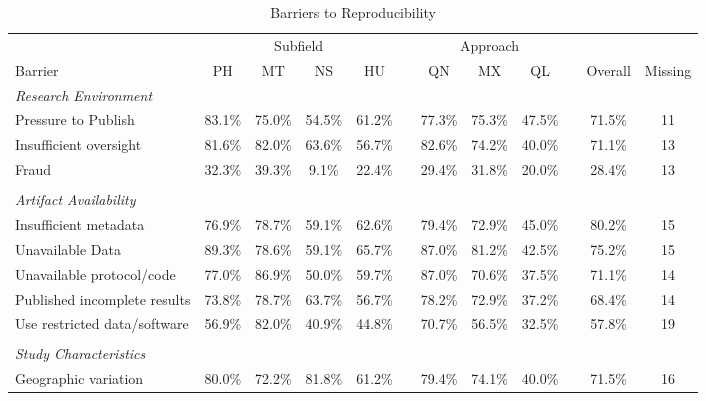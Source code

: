 \documentclass[]{interact}
\theoremstyle{plain}%
\theoremstyle{definition}
\theoremstyle{remark}
\begin{document}
\newpage
\begin{landscape}
\begin{table}[h]
    \centering
    \begin{threeparttable}
    \caption{Barriers to Reproducibility}
    \begin{tabular}{l c c c c c c c c c c c}
         \hline
                    & \multicolumn{4}{1}{Subfield}  & & \multicolumn{3}{1}{Approach} & & &\\
         Barrier    & PH & MT & NS & HU            & & QN & MX & QL              & & Overall & Missing\\
         \hline
         \textit{Research Environment}      & & & & & & & & & & &\\
         Pressure to Publish                & 83.1\% & 75.0\% & 54.5\% & 61.2\% & & 77.3\% & 75.3\% & 47.5\% & & 71.5\% & 11 \\
         Insufficient oversight             & 81.6\% & 82.0\% & 63.6\% & 56.7\% & & 82.6\% & 74.2\% & 40.0\% & & 71.1\% & 13 \\
         Fraud                              & 32.3\% & 39.3\% & 9.1\%  & 22.4\% & & 29.4\% & 31.8\% & 20.0\% & & 28.4\% & 13 \\
                                            & & & & & & & & & & &\\
         \textit{Artifact Availability}     & & & & & & & & & & &\\
         Insufficient metadata              & 76.9\% & 78.7\% & 59.1\% & 62.6\% & & 79.4\% & 72.9\% & 45.0\% & & 80.2\% & 15\\
         Unavailable Data                   & 89.3\% & 78.6\% & 59.1\% & 65.7\% & & 87.0\% & 81.2\% & 42.5\% & & 75.2\% & 15 \\
         Unavailable protocol/code          & 77.0\% & 86.9\% & 50.0\% & 59.7\% & & 87.0\% & 70.6\% & 37.5\% & & 71.1\% & 14 \\
         Published incomplete results       & 73.8\% & 78.7\% & 63.7\% & 56.7\% & & 78.2\% & 72.9\% & 37.2\% & & 68.4\% & 14 \\
         Use restricted data/software       & 56.9\% & 82.0\% & 40.9\% & 44.8\% & & 70.7\% & 56.5\% & 32.5\% & & 57.8\% & 19\\
                                            & & & & & & & & & & &\\
         \textit{Study Characteristics}     & & & & & & & & & & &\\
         Geographic variation               & 80.0\% & 72.2\% & 81.8\% & 61.2\% & & 79.4\% & 74.1\% & 40.0\% &  & 71.5\% & 16 \\

\end{tabular}
\end{threeparttable}
\end{table}
\end{landscape}
\end{document}
